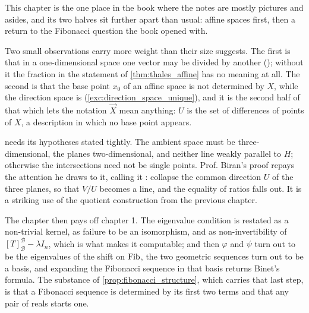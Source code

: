 \begin{ainote}
This chapter is the one place in the book where the notes are mostly pictures
and asides, and its two halves sit further apart than usual: affine spaces
first, then a return to the Fibonacci question the book opened with.

Two small observations carry more weight than their size suggests. The first is
that in a one-dimensional space one vector may be divided by another
(); without it the fraction in the statement of
\cref{thm:thales_affine} has no meaning at all. The second is that the base
point $x_0$ of an affine space is not determined by $X$, while the direction
space is (\cref{exc:direction_space_unique}), and it is the second half of that
which lets the notation $\vec{X}$ mean anything: $U$ is the set of differences
of points of $X$, a description in which no base point appears.

 needs its hypotheses stated tightly. The ambient space
must be three-dimensional, the planes two-dimensional, and neither line weakly
parallel to $H$; otherwise the intersections need not be single points. Prof.
Biran's proof repays the attention he draws to it, calling it : collapse the common direction $U$ of the three planes,
so that $V/U$ becomes a line, and the equality of ratios falls out. It is a
striking use of the quotient construction from the previous chapter.

The chapter then pays off chapter 1. The eigenvalue condition is restated as a
non-trivial kernel, as failure to be an isomorphism, and as non-invertibility of
$[T]_{\mathcal{B}}^{\mathcal{B}} - \lambda I_n$, which is what makes it
computable; and then $\varphi$ and $\psi$ turn out to be the eigenvalues of the
shift on $\operatorname{Fib}$, the two geometric sequences turn out to be a basis, and
expanding the Fibonacci sequence in that basis returns Binet's formula. The
substance of \cref{prop:fibonacci_structure}, which carries that last step, is
that a Fibonacci sequence is determined by its first two terms and that any pair
of reals starts one.
\end{ainote}


